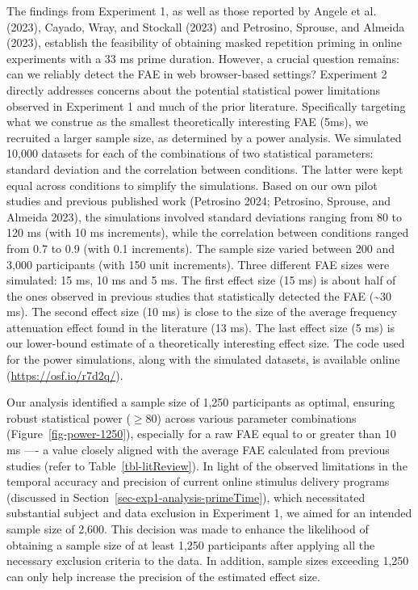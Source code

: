 \documentclass[
]{interact}
\begin{document}
The findings from Experiment 1, as well as those reported by Angele et
al. (2023), Cayado, Wray, and Stockall (2023) and Petrosino, Sprouse,
and Almeida (2023), establish the feasibility of obtaining masked
repetition priming in online experiments with a 33 ms prime duration.
However, a crucial question remains: can we reliably detect the FAE in
web browser-based settings? Experiment 2 directly addresses concerns
about the potential statistical power limitations observed in Experiment
1 and much of the prior literature. Specifically targeting what we
construe as the smallest theoretically interesting FAE (5ms), we
recruited a larger sample size, as determined by a power analysis. We
simulated 10,000 datasets for each of the combinations of two
statistical parameters: standard deviation and the correlation between
conditions. The latter were kept equal across conditions to simplify the
simulations. Based on our own pilot studies and previous published work
(Petrosino 2024; Petrosino, Sprouse, and Almeida 2023), the simulations
involved standard deviations ranging from 80 to 120 ms (with 10 ms
increments), while the correlation between conditions ranged from 0.7 to
0.9 (with 0.1 increments). The sample size varied between 200 and 3,000
participants (with 150 unit increments). Three different FAE sizes were
simulated: 15 ms, 10 ms and 5 ms. The first effect size (15 ms) is about
half of the ones observed in previous studies that statistically
detected the FAE (\textasciitilde30 ms). The second effect size (10 ms)
is close to the size of the average frequency attenuation effect found
in the literature (13 ms). The last effect size (5 ms) is our
lower-bound estimate of a theoretically interesting effect size. The
code used for the power simulations, along with the simulated datasets,
is available online (\url{https://osf.io/r7d2q/}).

Our analysis identified a sample size of 1,250 participants as optimal,
ensuring robust statistical power (\(\ge 80%
\)) across various parameter combinations (Figure~\ref{fig-power-1250}),
especially for a raw FAE equal to or greater than 10 ms ---- a value
closely aligned with the average FAE calculated from previous studies
(refer to Table~\ref{tbl-litReview}). In light of the observed
limitations in the temporal accuracy and precision of current online
stimulus delivery programs (discussed in
Section~\ref{sec-exp1-analysis-primeTime}), which necessitated
substantial subject and data exclusion in Experiment 1, we aimed for an
intended sample size of 2,600. This decision was made to enhance the
likelihood of obtaining a sample size of at least 1,250 participants
after applying all the necessary exclusion criteria to the data. In
addition, sample sizes exceeding 1,250 can only help increase the
precision of the estimated effect size.
\end{document}
